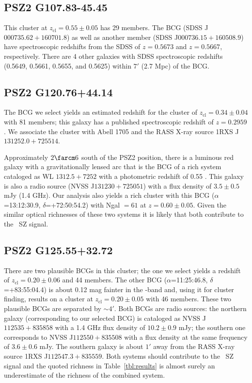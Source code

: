 \documentclass[apj, revtex4-1]{emulateapj}
\begin{document}
\subsection{PSZ2 G107.83-45.45} %
This cluster at $z_\mathrm{cl} = 0.55 \pm 0.05$ has 29 members. The BCG (SDSS J$000735.62+160701.8$) as well as another member (SDSS J$000736.15+160508.9$) have spectroscopic redshifts from the SDSS of $z=0.5673$ and $z=0.5667$, respectively. There are 4 other galaxies with SDSS spectroscopic redshifts (0.5649, 0.5661, 0.5655, and 0.5625) within $7'$ (2.7 Mpc) of the BCG.

\subsection{PSZ2 G120.76+44.14} %
The BCG we select yields an estimated redshift for the cluster of $z_\mathrm{cl} = 0.34 \pm 0.04$ with 81 members; this galaxy has a published spectroscopic redshift of $z=0.2959$ \citep{Huchra1990}. We associate the cluster with Abell 1705 and the RASS X-ray source 1RXS J$131252.0+725514$.

Approximately $2\farcm6$ south of the PSZ2 position, there is a luminous red galaxy with a gravitationally lensed arc that is the BCG of a rich system cataloged as WL $1312.5+7252$ with a photometric redshift of 0.55 \citep{Dahle2003}. This galaxy is also a radio source (NVSS J$131230+725051$) with a flux density of $3.5 \pm 0.5$ mJy (1.4 GHz). Our analysis also yields a rich cluster with this BCG ($\alpha$=13:12:30.9, $\delta$=+72:50:54.2) with Ngal $= 61$ at $z=0.60 \pm 0.05$. Given the similar optical richnesses of these two systems it is likely that both contribute to the \planck\ SZ signal.


\subsection{PSZ2 G125.55+32.72} %
There are two plausible BCGs in this cluster; the one we select yields a redshift of $z_\mathrm{cl} = 0.20 \pm 0.06$ and 44 members. The other BCG ($\alpha$=11:25:46.8, $\delta$=+83:55:04.4) is about 0.12 mag fainter in the \sdssi-band and, using it for cluster finding, results on a cluster at $z_\mathrm{cl} = 0.20 \pm 0.05$ with 46 members. These two plausible BCGs are separated by $\sim4'$. Both BCGs are radio sources: the northern galaxy (corresponding to our selected BCG) is cataloged as NVSS J$112535+835858$ with a 1.4 GHz flux density of $10.2 \pm 0.9$ mJy; the southern one corresponds to NVSS J$112550+835508$ with a flux density at the same frequency of $3.6 \pm 0.6$ mJy. The southern galaxy is about $1'$ away from the RASS X-ray source 1RXS J$112547.3+835559$. Both systems should contribute to the \planck\ SZ signal and the quoted richness in Table~\ref{tbl:results} is almost surely an underestimate of the richness of the combined system.
\end{document}
